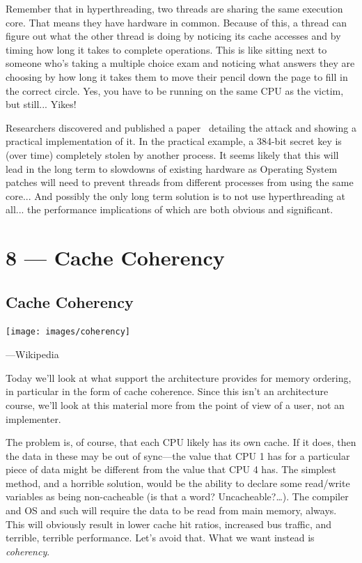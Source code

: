 \documentclass[a4paper]{report}
\begin{document}
Remember that in hyperthreading, two threads are sharing the same execution core. That means they have hardware in common. Because of this, a thread can figure out what the other thread is doing by noticing its cache accesses and by timing how long it takes to complete operations. This is like sitting next to someone who's taking a multiple choice exam and noticing what answers they are choosing by how long it takes them to move their pencil down the page to fill in the correct circle. Yes, you have to be running on the same CPU as the victim, but still... Yikes! 

Researchers discovered and published a paper~\cite{portsmash} detailing the attack and showing a practical implementation of it. In the practical example, a 384-bit secret key is (over time) completely stolen by another process. It seems likely that this will lead in the long term to slowdowns of existing hardware as Operating System patches will need to prevent threads from different processes from using the same core... And possibly the only long term solution is to not use hyperthreading at all... the performance implications of which are both obvious and significant.









\chapter*{8 --- Cache Coherency}


\section*{Cache Coherency}

\begin{center}
    \texttt{[image: images/coherency]}

\hfill ---Wikipedia
\end{center}

Today we'll look at what support the architecture provides for memory ordering, in
particular in the form of cache coherence. Since this isn't an
architecture course, we'll look at this material more from the point
of view of a user, not an implementer.

The problem is, of course, that each CPU likely has its own cache. If it does, then the data in these may be out of sync---the value that CPU 1 has for a particular piece of data might be different from the value that CPU 4 has. The simplest method, and a horrible solution, would be the ability to declare some read/write variables as being non-cacheable (is that a word? Uncacheable?\ldots). The compiler and OS and such will require the data to be read from main memory, always. This will obviously result in lower cache hit ratios, increased bus traffic, and terrible, terrible performance. Let's avoid that. What we want instead is \textit{coherency}.
\end{document}
